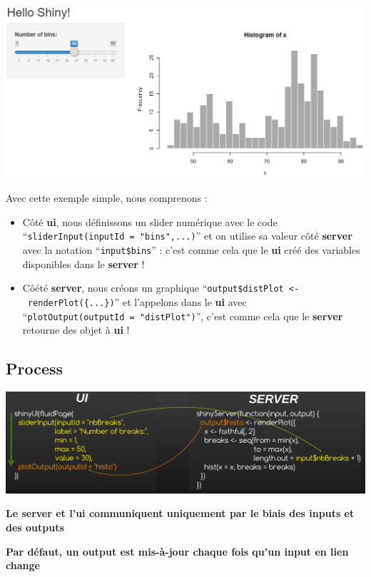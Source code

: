 \documentclass[]{article}
\begin{document}
\includegraphics{img/hello_shiny.png}

Avec cette exemple simple, nous comprenons :

\begin{itemize}
\item
  Côté \textbf{ui}, nous définissons un slider numérique avec le code
  ``\texttt{sliderInput(inputId\ =\ "bins",...)}'' et on utilise sa
  valeur côté \textbf{server} avec la notation ``\texttt{input\$bins}''
  : c'est comme cela que le \textbf{ui} créé des variables disponibles
  dans le \textbf{server} !
\item
  Côété \textbf{server}, nous créons un graphique
  ``\texttt{output\$distPlot\ \textless{}-\ renderPlot(\{...\})}'' et
  l'appelons dans le \textbf{ui} avec
  ``\texttt{plotOutput(outputId\ =\ "distPlot")}'', c'est comme cela que
  le \textbf{server} retourne des objet à \textbf{ui} !
\end{itemize}

\subsection{Process}\label{process}

\includegraphics{img/shiny_process.png}

\textbf{Le server et l'ui communiquent uniquement par le biais des
inputs et des outputs}

\textbf{Par défaut, un output est mis-à-jour chaque fois qu'un input en
lien change}
\end{document}

